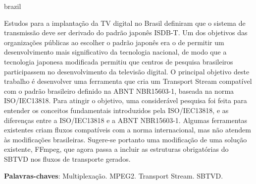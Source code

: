 \documentclass[
	12pt,				%
	openright,			%
	twoside,			%
	a4paper,			%
	brazil,
	french,				%
	english
	]{abntex2}
\begin{document}



\setlength{\absparsep}{18pt} %
\begin{resumo}[Resumo]
 \begin{otherlanguage*}{brazil}
	
Estudos para a implantação da TV digital no Brasil definiram que o sistema de transmissão deve ser derivado do padrão japonês ISDB-T. Um dos objetivos das organizações públicas ao escolher o padrão japonês era o de permitir um desenvolvimento mais significativo da tecnologia nacional, de modo que a tecnologia japonesa modificada permitiu que centros de pesquisa brasileiros participassem no desenvolvimento da televisão digital. O principal objetivo deste trabalho é desenvolver uma ferramenta que cria um Transport Stream compatível com o padrão brasileiro definido na ABNT NBR15603-1, baseada na norma ISO/IEC13818. Para atingir o objetivo, uma considerável pesquisa foi feita para entender os conceitos fundamentais introduzidos pela ISO/IEC13818, e as diferenças entre a ISO/IEC13818 e a ABNT NBR15603-1. Algumas ferramentas existentes criam fluxos compatíveis com a norma internacional, mas não atendem às modificações brasileiras. Sugere-se portanto uma modificação de uma solução existente, FFmpeg, que agora passa a incluir as estruturas obrigatórias do SBTVD nos fluxos de transporte gerados.

 \textbf{Palavras-chaves}: Multiplexação. MPEG2. Transport Stream. SBTVD.
 \end{otherlanguage*}
\end{resumo}
\end{document}
